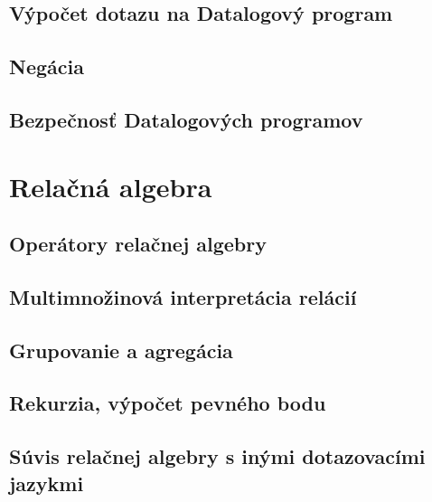 \documentclass[10pt,a4paper]{article}
\begin{document}
\subsection{Výpočet dotazu na Datalogový program}
\subsection{Negácia}
\subsection{Bezpečnosť Datalogových programov}
    
\section{Relačná algebra} 
\label{relacna_algebra}

\subsection{Operátory relačnej algebry}
\subsection{Multimnožinová interpretácia relácií}
\subsection{Grupovanie a agregácia}
\subsection{Rekurzia, výpočet pevného bodu}
\subsection{Súvis relačnej algebry s inými dotazovacími jazykmi}
\label{relacna_algebra_suvis}
    
\end{document}

